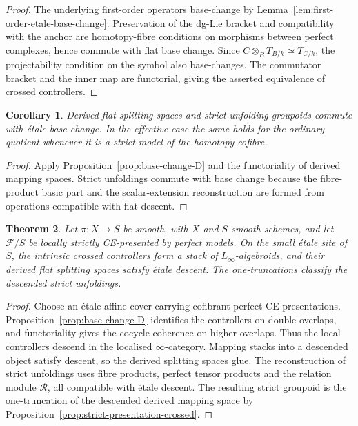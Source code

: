 \documentclass[11pt,reqno,a4paper,dvipsnames,x11names]{amsart}
\numberwithin{equation}{section}
\theoremstyle{plain}
\newtheorem{theorem}{Theorem}[section]
\newtheorem{corollary}[theorem]{Corollary}
\theoremstyle{definition}
\theoremstyle{remark}
\newcommand{\kk}{k}
\newcommand{\cF}{\mathcal F}
\newcommand{\cR}{\mathcal R}
\newcommand{\from}{\colon}
\begin{document}
\begin{proof}
The underlying first-order operators base-change by Lemma~\ref{lem:first-order-etale-base-change}. Preservation of the dg-Lie bracket and compatibility with the anchor are homotopy-fibre conditions on morphisms between perfect complexes, hence commute with flat base change. Since
\(C\otimes_BT_{B/\kk}\simeq T_{C/\kk}\), the projectability condition on the symbol also base-changes. The commutator bracket and the inner map are functorial, giving the asserted equivalence of crossed controllers.
\end{proof}

\begin{corollary}\label{cor:base-change-unf}
Derived flat splitting spaces and strict unfolding groupoids commute with \'etale base change. In the effective case the same holds for the ordinary quotient whenever it is a strict model of the homotopy cofibre.
\end{corollary}

\begin{proof}
Apply Proposition~\ref{prop:base-change-D} and the functoriality of derived mapping spaces. Strict unfoldings commute with base change because the fibre-product basic part and the scalar-extension reconstruction are formed from operations compatible with flat descent.
\end{proof}

\begin{theorem}\label{thm:descent-controller}
Let \(\pi\from X\to S\) be smooth, with \(X\) and \(S\) smooth schemes, and let \(\cF/S\) be locally strictly CE-presented by perfect models. On the small \'etale site of \(S\), the intrinsic crossed controllers form a stack of \(L_\infty\)-algebroids, and their derived flat splitting spaces satisfy \'etale descent. The one-truncations classify the descended strict unfoldings.
\end{theorem}

\begin{proof}
Choose an \'etale affine cover carrying cofibrant perfect CE presentations. Proposition~\ref{prop:base-change-D} identifies the controllers on double overlaps, and functoriality gives the cocycle coherence on higher overlaps. Thus the local controllers descend in the localised \(\infty\)-category. Mapping stacks into a descended object satisfy descent, so the derived splitting spaces glue. The reconstruction of strict unfoldings uses fibre products, perfect tensor products and the relation module \(\cR\), all compatible with \'etale descent. The resulting strict groupoid is the one-truncation of the descended derived mapping space by Proposition~\ref{prop:strict-presentation-crossed}.
\end{proof}
\end{document}
